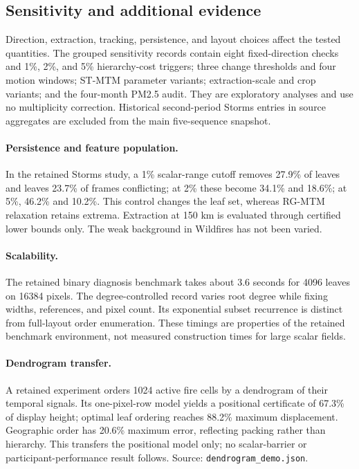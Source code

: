 \subsection{Sensitivity and additional evidence}
Direction, extraction, tracking, persistence, and layout choices affect the tested quantities. The grouped sensitivity records contain eight fixed-direction checks and 1\%, 2\%, and 5\% hierarchy-cost triggers; three change thresholds and four motion windows; ST-MTM parameter variants; extraction-scale and crop variants; and the four-month PM2.5 audit. They are exploratory analyses and use no multiplicity correction. Historical second-period Storms entries in source aggregates are excluded from the main five-sequence snapshot.

\paragraph{Persistence and feature population.} In the retained Storms study, a 1\% scalar-range cutoff removes 27.9\% of leaves and leaves 23.7\% of frames conflicting; at 2\% these become 34.1\% and 18.6\%; at 5\%, 46.2\% and 10.2\%. This control changes the leaf set, whereas RG-MTM relaxation retains extrema. Extraction at 150 km is evaluated through certified lower bounds only. The weak background in Wildfires has not been varied.

\paragraph{Scalability.} The retained binary diagnosis benchmark takes about 3.6 seconds for 4096 leaves on 16384 pixels. The degree-controlled record varies root degree while fixing widths, references, and pixel count. Its exponential subset recurrence is distinct from full-layout order enumeration. These timings are properties of the retained benchmark environment, not measured construction times for large scalar fields.

\paragraph{Dendrogram transfer.} A retained experiment orders 1024 active fire cells by a dendrogram of their temporal signals. Its one-pixel-row model yields a positional certificate of 67.3\% of display height; optimal leaf ordering reaches 88.2\% maximum displacement. Geographic order has 20.6\% maximum error, reflecting packing rather than hierarchy. This transfers the positional model only; no scalar-barrier or participant-performance result follows. Source: \texttt{dendrogram\_demo.json}.

